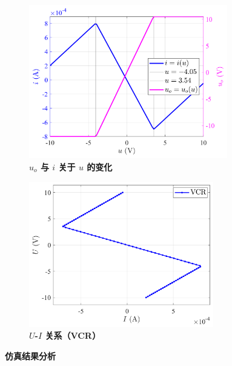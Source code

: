 \documentclass[UTF8]{report}
\theoremstyle{MyLineTheoremStyle} %
\theoremstyle{MyBlockTheoremStyle} %
\theoremstyle{MySubsubsectionStyle} %
\begin{document}
\begin{figure}[H]\centering
\begin{subfigure}[t]{0.52\textwidth}\centering
    \includegraphics[height=190pt]{assets/3/2024-09-13_01-13-08.png}
    \caption{\bfseries $u_o$ 与 $i$ 关于 $u$ 的变化}
\end{subfigure}\begin{subfigure}[t]{0.47\textwidth}\centering
    \includegraphics[height=180pt]{assets/3/2024-09-13_01-13-52.png}
    \caption{\bfseries $U$-$I$ 关系（VCR）}
\end{subfigure}
\caption{\bfseries 仿真结果分析 }\label{仿真结果分析}
\end{figure}

\end{document}
